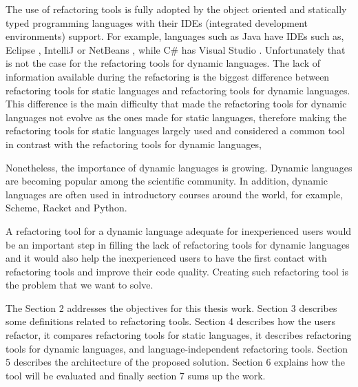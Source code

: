 The use of refactoring tools is fully adopted by the object oriented and statically typed programming languages with their IDEs (integrated development environments) support.
For example, languages such as Java have IDEs such as, Eclipse \cite{carlson2005eclipse}, IntelliJ \cite{bock2011intellij} or NetBeans \cite{boudreau2002netbeans}, while C\# has Visual Studio \cite{guckenheimer2006software}.
Unfortunately that is not the case for the refactoring tools for dynamic languages. 
The lack of information available during the refactoring is the biggest difference between refactoring tools for static languages and refactoring tools for dynamic languages.
This difference is the main difficulty that made the refactoring tools for dynamic languages not evolve as the ones made for static languages, therefore making the refactoring tools for static languages largely used and considered a common tool in contrast with the refactoring tools for dynamic languages,   

Nonetheless, the importance of dynamic languages is growing. Dynamic languages are becoming popular among the scientific community.
In addition, dynamic languages are often used in introductory courses around the world, for example, Scheme, Racket and Python.

A refactoring tool for a dynamic language adequate for inexperienced users would be an important step in filling the lack of refactoring tools for dynamic languages and it would also help the inexperienced users to have the first contact with refactoring tools and improve their code quality. Creating such refactoring tool is the problem that we want to solve.



The Section 2 addresses the objectives for this thesis work. 
Section 3 describes some definitions related to refactoring tools.
Section 4 describes how the users refactor, it compares refactoring tools for static languages, it describes refactoring tools for dynamic languages, and language-independent refactoring tools.
Section 5 describes the architecture of the proposed solution. 
Section 6 explains how the tool will be evaluated and finally section 7 sums up the work.








